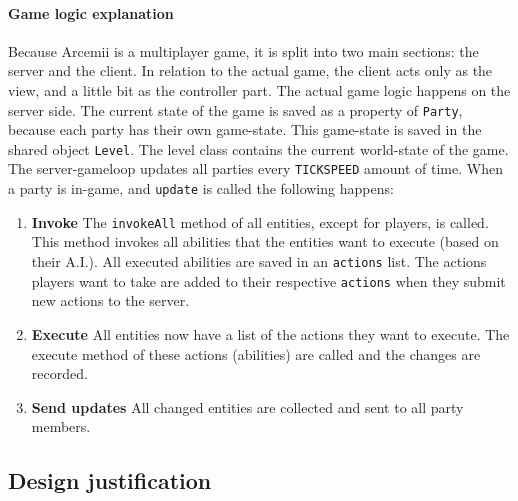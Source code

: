 \documentclass[../main.tex]{subfiles}
\begin{document}
        \paragraph{Game logic explanation}
        Because Arcemii is a multiplayer game, it is split into two main sections: the server and the client. In relation to the actual game, the client acts only as the view, and a little bit as the controller part. The actual game logic happens on the server side. The current state of the game is saved as a property of \texttt{Party}, because each party has their own game-state. This game-state is saved in the shared object \texttt{Level}. The level class contains the current world-state of the game. The server-gameloop updates all parties every \texttt{TICKSPEED} amount of time. When a party is in-game, and \texttt{update} is called the following happens:

        \begin{enumerate}
            \item \textbf{Invoke} The \texttt{invokeAll} method of all entities, except for players, is called. This method invokes all abilities that the entities want to execute (based on their A.I.). All executed abilities are saved in an \texttt{actions} list. The actions players want to take are added to their respective \texttt{actions} when they submit new actions to the server.
            \item \textbf{Execute} All entities now have a list of the actions they want to execute. The execute method of these actions (abilities) are called and the changes are recorded.
            \item \textbf{Send updates} All changed entities are collected and sent to all party members.
        \end{enumerate}
        
    \pagebreak 
	\subsection{Design justification}
\end{document}
